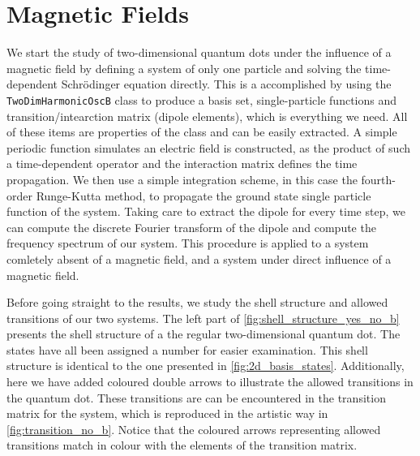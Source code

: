 \chapter{Magnetic Fields}

We start the study of two-dimensional quantum dots under the influence of a magnetic 
field by defining a system of only one particle and solving the time-dependent 
Schrödinger equation
directly. This is a accomplished by using the \lstinline{TwoDimHarmonicOscB} class
to produce a basis set, single-particle functions and transition/intearction matrix (dipole elements),
which is everything we need. All of these items are properties of the class and can be
easily extracted. A simple periodic function simulates an electric field is constructed, as 
the product of such a time-dependent operator and the interaction matrix defines the 
time propagation. We then use a simple integration scheme, in this case the fourth-order 
Runge-Kutta method, to propagate the ground state single particle function of the system.
Taking care to extract the dipole for every time step, we can compute the discrete Fourier 
transform of the dipole and compute the frequency spectrum of our system. This procedure is 
applied to a system comletely absent of a magnetic field, and a system under direct influence 
of a magnetic field.

Before going straight to the results, we study the shell structure and allowed transitions of 
our two systems. The left part of \autoref{fig:shell_structure_yes_no_b} presents the 
shell structure of a the regular two-dimensional quantum dot. The states have all been assigned
a number for easier examination. This shell structure is 
identical to the one presented in \autoref{fig:2d_basis_states}. Additionally, here we have added
coloured double arrows to illustrate the allowed transitions in the quantum dot. These 
transitions are can be encountered in the transition matrix for the system, which is
reproduced in the artistic way in \autoref{fig:transition_no_b}. Notice that the coloured 
arrows representing allowed transitions match in colour with the elements of the transition 
matrix.

